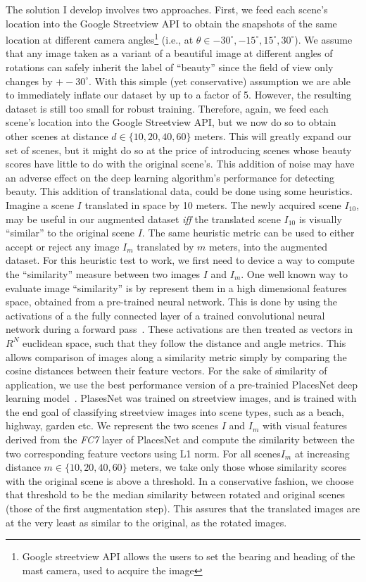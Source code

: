 The solution I develop involves two approaches. First, we feed each scene's location into the Google Streetview API to obtain the snapshots of the same location at different camera angles\footnote{Google streetview API allows the users to set the bearing and heading of the mast camera, used to acquire the image} (i.e., at $\theta \in {-30^{\circ}, -15^{\circ} , 15^{\circ} , 30^{\circ} }$). We assume that any image taken as a variant of a beautiful image at different angles of rotations can safely inherit the label of ``beauty'' since the field of view only changes by $+- 30^\circ $. With this simple (yet conservative) assumption we are able to immediately inflate our dataset by up to a factor of 5.
However, the resulting dataset is still too small for robust training. Therefore, again, we feed each scene's location into the Google Streetview API, but we now do so to obtain other scenes at  distance $d \in \{10,20,40,60\}$ meters.  This will greatly expand our set of scenes, but it might do so at the price of introducing scenes whose beauty scores have little to do with the original scene's. 
This addition of noise may have an adverse effect on the deep learning algorithm's performance for detecting beauty. 
This addition of translational data, could be done using some heuristics. Imagine a scene $I$ translated in space by 10 meters. The newly acquired scene $I_{10}$, may be useful in our augmented dataset \textit{iff} the translated scene $I_{10}$ is visually ``similar'' to the original scene $I$. The same heuristic metric can be used to either accept or reject any image $I_{m}$ translated by $m$ meters, into the augmented dataset. 
For this heuristic test to work, we first need to device a way to compute the ``similarity'' measure between two images $I$ and $I_{m}$. 
One well known way to evaluate image ``similarity'' is by represent them in a high dimensional features space, obtained from a pre-trained neural network. This is done by using the activations of a the fully connected layer of a trained convolutional neural network during a forward pass~\cite{babenko2015aggregating,Lin_2015_CVPR_Workshops,varga2016fast}. These activations are then treated as vectors in $R^N$ euclidean space, such that they follow the distance and angle metrics. This allows comparison of images along a similarity metric simply by comparing the cosine distances between their feature vectors. For the sake of similarity of application, we use the best performance version of a pre-trainied PlacesNet deep learning model~\cite{zhou2014learning}. PlasesNet was trained on streetview images, and is trained with the end goal of classifying streetview images into scene types, such as a beach, highway, garden etc. We represent the two scenes $I$ and $I_m$ with visual features derived from the \textsl{FC7} layer of PlacesNet and compute the similarity between the two corresponding feature vectors using L1 norm. 
For all scenes$I_m$ at increasing distance $m \in \{10,20,40,60\}$ meters,  we take only those whose similarity scores with the original scene is above a threshold. In a conservative fashion, we choose that threshold to be the median similarity between rotated and original scenes (those of the first augmentation step). This assures that the translated images are at the very least as similar to the original, as the rotated images.
